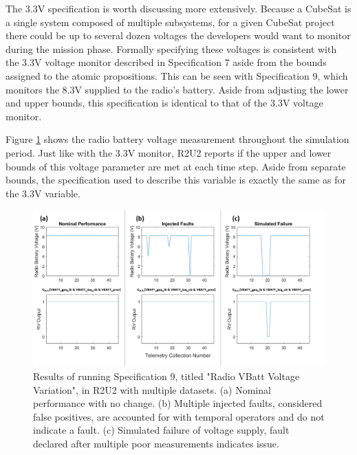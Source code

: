 \documentclass[conf]{new-aiaa}
\begin{document}
The 3.3V specification is worth discussing more extensively. Because a CubeSat is a single system composed of multiple subsystems, for a given CubeSat project there could be up to several dozen voltages the developers would want to monitor during the mission phase. Formally specifying these voltages is consistent with the 3.3V voltage monitor described in Specification 7 aside from the bounds assigned to the atomic propositions. This can be seen with Specification 9, which monitors the 8.3V supplied to the radio's battery. Aside from adjusting the lower and upper bounds, this specification is identical to that of the 3.3V voltage monitor.

Figure \ref{VBATTSpecResults} shows the radio battery voltage measurement throughout the simulation period. Just like with the 3.3V monitor, R2U2 reports if the upper and lower bounds of this voltage parameter are met at each time step. Aside from separate bounds, the specification used to describe this variable is exactly the same as for the 3.3V variable.

\begin{figure}[!hb]
\centering
\includegraphics[width=.8\textwidth]{Fig/VBATT_Spec9.png}
\caption{Results of running Specification 9, titled "Radio VBatt Voltage Variation", in R2U2 with multiple datasets. (a) Nominal performance with no change. (b) Multiple injected faults, considered false positives, are accounted for with temporal operators and do not indicate a fault. (c) Simulated failure of voltage supply, fault declared after multiple poor measurements indicates issue.}
\label{VBATTSpecResults}
\end{figure}
\end{document}
